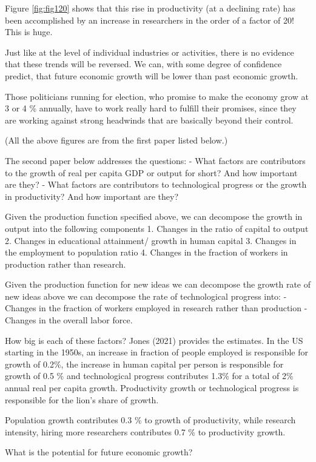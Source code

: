 \documentclass[
]{book}
\begin{document}
Figure \ref{fig:fig120} shows that this rise in productivity (at a declining rate) has been accomplished by an increase in researchers in the order of a factor of 20! This is huge.

Just like at the level of individual industries or activities, there is no evidence that these trends will be reversed. We can, with some degree of confidence predict, that future economic growth will be lower than past economic growth.

Those politicians running for election, who promise to make the economy grow at 3 or 4 \% annually, have to work really hard to fulfill their promises, since they are working against strong headwinds that are basically beyond their control.

(All the above figures are from the first paper listed below.)

The second paper below addresses the questions:
- What factors are contributors to the growth of real per capita GDP or output for short? And how important are they?
- What factors are contributors to technological progress or the growth in productivity? And how important are they?

Given the production function specified above, we can decompose the growth in output into the following components
1. Changes in the ratio of capital to output
2. Changes in educational attainment/ growth in human capital
3. Changes in the employment to population ratio
4. Changes in the fraction of workers in production rather than research.

Given the production function for new ideas we can decompose the growth rate of new ideas above we can decompose the rate of technological progress into:
- Changes in the fraction of workers employed in research rather than production
- Changes in the overall labor force.

How big is each of these factors? Jones (2021) provides the estimates. In the US starting in the 1950s, an increase in fraction of people employed is responsible for growth of 0.2\%, the increase in human capital per person is responsible for growth of 0.5 \% and technological progress contributes 1.3\% for a total of 2\% annual real per capita growth. Productivity growth or technological progress is responsible for the lion's share of growth.

Population growth contributes 0.3 \% to growth of productivity, while research intensity, hiring more researchers contributes 0.7 \% to productivity growth.

What is the potential for future economic growth?
\end{document}
